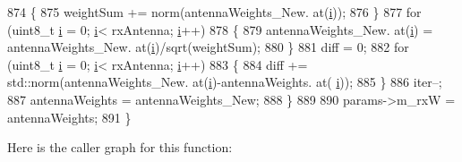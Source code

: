 \begin{DoxyCode}
874                 \{
875                         weightSum += norm(antennaWeights\_New. at(\hyperlink{bernuolliDistribution_8m_a6f6ccfcf58b31cb6412107d9d5281426}{i}));
876                 \}
877                 \textcolor{keywordflow}{for} (uint8\_t \hyperlink{bernuolliDistribution_8m_a6f6ccfcf58b31cb6412107d9d5281426}{i} = 0; \hyperlink{bernuolliDistribution_8m_a6f6ccfcf58b31cb6412107d9d5281426}{i}< rxAntenna; \hyperlink{bernuolliDistribution_8m_a6f6ccfcf58b31cb6412107d9d5281426}{i}++)
878                 \{
879                         antennaWeights\_New. at(\hyperlink{bernuolliDistribution_8m_a6f6ccfcf58b31cb6412107d9d5281426}{i}) = antennaWeights\_New. at(\hyperlink{bernuolliDistribution_8m_a6f6ccfcf58b31cb6412107d9d5281426}{i})/sqrt(weightSum);
880                 \}
881                 diff = 0;
882                 \textcolor{keywordflow}{for} (uint8\_t \hyperlink{bernuolliDistribution_8m_a6f6ccfcf58b31cb6412107d9d5281426}{i} = 0; \hyperlink{bernuolliDistribution_8m_a6f6ccfcf58b31cb6412107d9d5281426}{i}< rxAntenna; \hyperlink{bernuolliDistribution_8m_a6f6ccfcf58b31cb6412107d9d5281426}{i}++)
883                 \{
884                         diff += std::norm(antennaWeights\_New. at(\hyperlink{bernuolliDistribution_8m_a6f6ccfcf58b31cb6412107d9d5281426}{i})-antennaWeights. at(
      \hyperlink{bernuolliDistribution_8m_a6f6ccfcf58b31cb6412107d9d5281426}{i}));
885                 \}
886                 iter--;
887                 antennaWeights = antennaWeights\_New;
888         \}
889 
890         params->m\_rxW = antennaWeights;
891 \}
\end{DoxyCode}


Here is the caller graph for this function\+:


